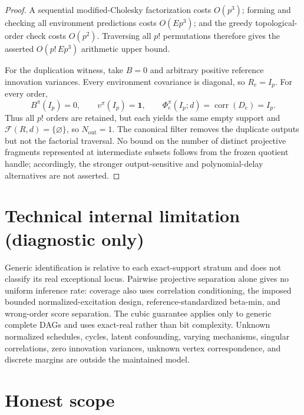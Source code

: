 \documentclass{article}
\begin{document}
\begin{proof}
A sequential modified-Cholesky factorization costs \(O(p^3)\); forming and checking all environment predictions costs \(O(Ep^3)\); and the greedy topological-order check costs \(O(p^2)\).  Traversing all \(p!\) permutations therefore gives the asserted \(O(p!\,Ep^3)\) arithmetic upper bound.

For the duplication witness, take \(B=0\) and arbitrary positive reference innovation variances.  Every environment covariance is diagonal, so \(R_e=I_p\).  For every order,
\[
 B^\pi(I_p)=0,\qquad v^\pi(I_p)=\mathbf 1,
 \qquad \Phi_e^\pi(I_p;d)=\operatorname{corr}(D_e)=I_p.
\]
Thus all \(p!\) orders are retained, but each yields the same empty support and
\(\mathcal F(R,d)=\{\varnothing\}\), so \(N_{\mathrm{out}}=1\).  The canonical filter removes the duplicate outputs but not the factorial traversal.  No bound on the number of distinct projective fragments represented at intermediate subsets follows from the frozen quotient handle; accordingly, the stronger output-sensitive and polynomial-delay alternatives are not asserted.
\end{proof}

\section*{Technical internal limitation (diagnostic only)}

Generic identification is relative to each exact-support stratum and does not classify its real exceptional locus. Pairwise projective separation alone gives no uniform inference rate: coverage also uses correlation conditioning, the imposed bounded normalized-excitation design, reference-standardized beta-min, and wrong-order score separation. The cubic guarantee applies only to generic complete DAGs and uses exact-real rather than bit complexity. Unknown normalized schedules, cycles, latent confounding, varying mechanisms, singular correlations, zero innovation variances, unknown vertex correspondence, and discrete margins are outside the maintained model.

\section{Honest scope}
\end{document}
